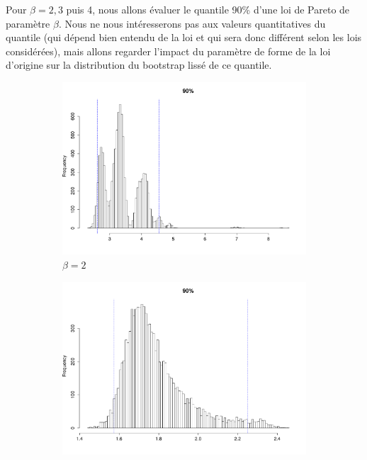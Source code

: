 \documentclass{article}
\renewcommand*{\(}{ \left( }
\renewcommand*{\)}{ \right) }
\begin{document}
Pour $\beta = 2, 3$ puis 4, nous allons évaluer le quantile 90\% d'une loi de Pareto de paramètre $\beta$. Nous ne nous intéresserons pas aux valeurs quantitatives du quantile (qui dépend bien entendu de la loi et qui sera donc différent selon les lois considérées), mais allons regarder l'impact du paramètre de forme de la loi d'origine sur la distribution du bootstrap lissé de ce quantile.
\begin{figure}[H]
    \centering
    \begin{subfigure}[t]{0.3\textwidth}
        \includegraphics[width = \linewidth]{img/Smooth-90-2.pdf}
        \caption{$\beta = 2$}
        \label{fig:beta2}
    \end{subfigure}%
    \begin{subfigure}[t]{0.3\textwidth}
        \includegraphics[width = \linewidth]{img/Smooth-90-3.pdf}

\end{subfigure}
\end{figure}
\end{document}
